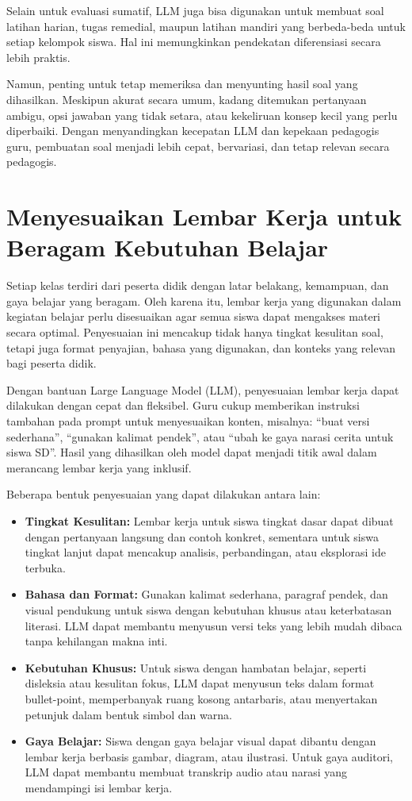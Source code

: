 Selain untuk evaluasi sumatif, LLM juga bisa digunakan untuk membuat soal latihan harian, tugas remedial, maupun latihan mandiri yang berbeda-beda untuk setiap kelompok siswa. Hal ini memungkinkan pendekatan diferensiasi secara lebih praktis.

Namun, penting untuk tetap memeriksa dan menyunting hasil soal yang dihasilkan. Meskipun akurat secara umum, kadang ditemukan pertanyaan ambigu, opsi jawaban yang tidak setara, atau kekeliruan konsep kecil yang perlu diperbaiki. Dengan menyandingkan kecepatan LLM dan kepekaan pedagogis guru, pembuatan soal menjadi lebih cepat, bervariasi, dan tetap relevan secara pedagogis.


\section{Menyesuaikan Lembar Kerja untuk Beragam Kebutuhan Belajar}

Setiap kelas terdiri dari peserta didik dengan latar belakang, kemampuan, dan gaya belajar yang beragam. Oleh karena itu, lembar kerja yang digunakan dalam kegiatan belajar perlu disesuaikan agar semua siswa dapat mengakses materi secara optimal. Penyesuaian ini mencakup tidak hanya tingkat kesulitan soal, tetapi juga format penyajian, bahasa yang digunakan, dan konteks yang relevan bagi peserta didik.

Dengan bantuan Large Language Model (LLM), penyesuaian lembar kerja dapat dilakukan dengan cepat dan fleksibel. Guru cukup memberikan instruksi tambahan pada prompt untuk menyesuaikan konten, misalnya: “buat versi sederhana”, “gunakan kalimat pendek”, atau “ubah ke gaya narasi cerita untuk siswa SD”. Hasil yang dihasilkan oleh model dapat menjadi titik awal dalam merancang lembar kerja yang inklusif.

Beberapa bentuk penyesuaian yang dapat dilakukan antara lain:

\begin{itemize}
	\item \textbf{Tingkat Kesulitan:} Lembar kerja untuk siswa tingkat dasar dapat dibuat dengan pertanyaan langsung dan contoh konkret, sementara untuk siswa tingkat lanjut dapat mencakup analisis, perbandingan, atau eksplorasi ide terbuka.
	\item \textbf{Bahasa dan Format:} Gunakan kalimat sederhana, paragraf pendek, dan visual pendukung untuk siswa dengan kebutuhan khusus atau keterbatasan literasi. LLM dapat membantu menyusun versi teks yang lebih mudah dibaca tanpa kehilangan makna inti.
	\item \textbf{Kebutuhan Khusus:} Untuk siswa dengan hambatan belajar, seperti disleksia atau kesulitan fokus, LLM dapat menyusun teks dalam format bullet-point, memperbanyak ruang kosong antarbaris, atau menyertakan petunjuk dalam bentuk simbol dan warna.
	\item \textbf{Gaya Belajar:} Siswa dengan gaya belajar visual dapat dibantu dengan lembar kerja berbasis gambar, diagram, atau ilustrasi. Untuk gaya auditori, LLM dapat membantu membuat transkrip audio atau narasi yang mendampingi isi lembar kerja.
\end{itemize}

